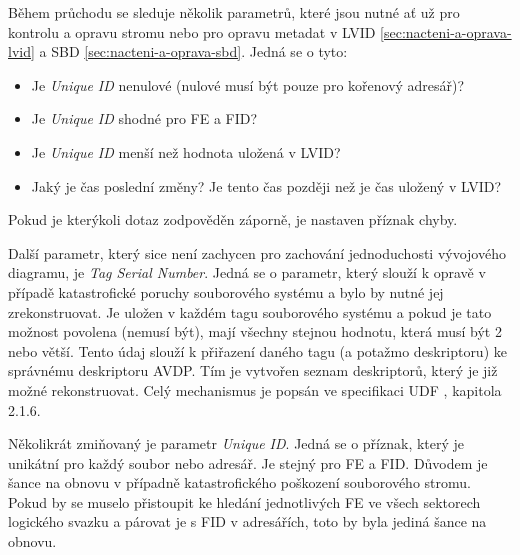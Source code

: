 Během průchodu se sleduje několik parametrů, které jsou nutné ať už pro kontrolu a opravu stromu nebo pro opravu metadat v LVID \ref{sec:nacteni-a-oprava-lvid} a SBD \ref{sec:nacteni-a-oprava-sbd}. Jedná se o tyto:
\begin{itemize}
    \item Je \textit{Unique ID} nenulové (nulové musí být pouze pro kořenový adresář)?
    \item Je \textit{Unique ID} shodné pro FE a FID?
    \item Je \textit{Unique ID} menší než hodnota uložená v LVID?
    \item Jaký je čas poslední změny? Je tento čas později než je čas uložený v LVID? 
\end{itemize}
Pokud je kterýkoli dotaz zodpověděn záporně, je nastaven příznak chyby.

Další parametr, který sice není zachycen pro zachování jednoduchosti vývojového diagramu, je \textit{Tag Serial Number}. Jedná se o parametr, který slouží k opravě v případě katastrofické poruchy souborového systému a bylo by nutné jej zrekonstruovat. Je uložen v každém tagu souborového systému a pokud je tato možnost povolena (nemusí být), mají všechny stejnou hodnotu, která musí být 2 nebo větší. Tento údaj slouží k přiřazení daného tagu (a potažmo deskriptoru) ke správnému deskriptoru AVDP. Tím je vytvořen seznam deskriptorů, který je již možné rekonstruovat. Celý mechanismus je popsán ve specifikaci UDF \cite{osta-udf-0201}, kapitola 2.1.6.

Několikrát zmiňovaný je parametr \textit{Unique ID}. Jedná se o příznak, který je unikátní pro každý soubor nebo adresář. Je stejný pro FE a FID. Důvodem je šance na obnovu v případně katastrofického poškození souborového stromu. Pokud by se muselo přistoupit ke hledání jednotlivých FE ve všech sektorech logického svazku a párovat je s FID v adresářích, toto by byla jediná šance na obnovu.

